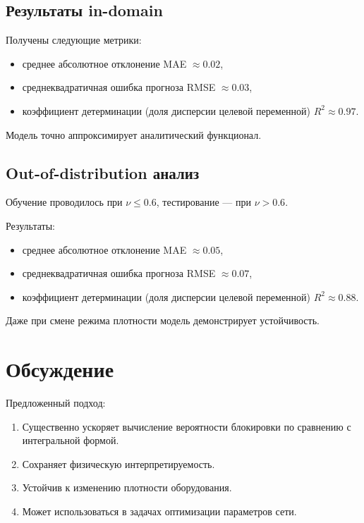 \documentclass[%
]{ittmm}
\begin{document}
\subsection{Результаты in-domain}

Получены следующие метрики:

\begin{itemize}
  \item среднее абсолютное отклонение MAE $\approx 0.02$,
  \item среднеквадратичная ошибка прогноза RMSE $\approx 0.03$,
  \item коэффициент детерминации (доля дисперсии целевой переменной) $R^2 \approx 0.97$.
\end{itemize}

Модель точно аппроксимирует аналитический функционал.

\subsection{Out-of-distribution анализ}

Обучение проводилось при $\nu \le 0.6$, тестирование — при $\nu > 0.6$.

Результаты:

\begin{itemize}
  \item среднее абсолютное отклонение MAE $\approx 0.05$,
  \item среднеквадратичная ошибка прогноза RMSE $\approx 0.07$,
  \item коэффициент детерминации (доля дисперсии целевой переменной) $R^2 \approx 0.88$.
\end{itemize}

Даже при смене режима плотности модель демонстрирует устойчивость.

\section{Обсуждение}

Предложенный подход:

\begin{enumerate}
  \item Существенно ускоряет вычисление вероятности блокировки по сравнению с интегральной формой.  
  \item Сохраняет физическую интерпретируемость.  
  \item Устойчив к изменению плотности оборудования.  
\item Может использоваться в задачах оптимизации параметров сети.  
\end{enumerate}
\end{document}
